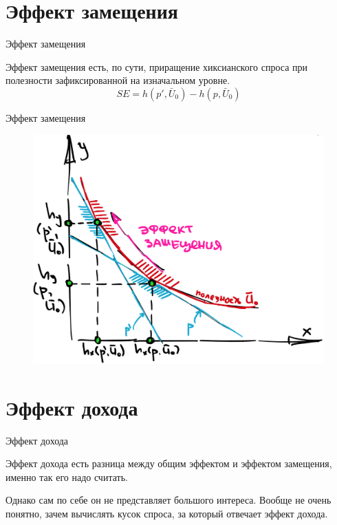 \documentclass{beamer}
\begin{document}
\section{Эффект замещения}

\begin{frame}{Эффект замещения}

Эффект замещения есть, по сути, приращение хиксианского спроса при полезности зафиксированной на изначальном уровне. 
$$ SE = h(p', \bar U_0) - h(p, \bar U_0) $$

\end{frame}

\begin{frame}{Эффект замещения}

\begin{figure}[hbt]
\centering
\includegraphics[width=.8 \textwidth]{SE.png}
\end{figure}

\end{frame}

\section{Эффект дохода}

\begin{frame}{Эффект дохода}

Эффект дохода есть разница между общим эффектом и эффектом замещения, именно так его надо считать. 

Однако сам по себе он не представляет большого интереса. Вообще не очень понятно, зачем вычислять кусок спроса, за который отвечает эффект дохода. 

\end{frame}
\end{document}
